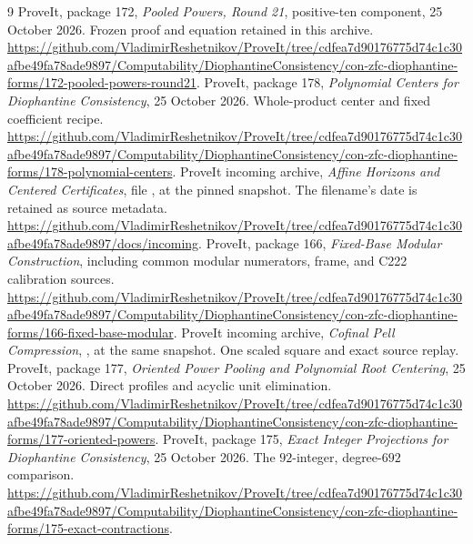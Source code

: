 \documentclass[11pt]{article}
\theoremstyle{remark}
\begin{document}
\clearpage
\begin{thebibliography}{9}
ProveIt, package 172, \emph{Pooled Powers, Round 21}, positive-ten component,
25 October 2026. Frozen proof and equation retained in this archive.
\url{https://github.com/VladimirReshetnikov/ProveIt/tree/cdfea7d90176775d74c1c30afbe49fa78ade9897/Computability/DiophantineConsistency/con-zfc-diophantine-forms/172-pooled-powers-round21}.
ProveIt, package 178, \emph{Polynomial Centers for Diophantine Consistency},
25 October 2026. Whole-product center and fixed coefficient recipe.
\url{https://github.com/VladimirReshetnikov/ProveIt/tree/cdfea7d90176775d74c1c30afbe49fa78ade9897/Computability/DiophantineConsistency/con-zfc-diophantine-forms/178-polynomial-centers}.
ProveIt incoming archive, \emph{Affine Horizons and Centered Certificates},
file ,
at the pinned snapshot. The filename's date is retained as source metadata.
\url{https://github.com/VladimirReshetnikov/ProveIt/tree/cdfea7d90176775d74c1c30afbe49fa78ade9897/docs/incoming}.
ProveIt, package 166, \emph{Fixed-Base Modular Construction}, including
common modular numerators, frame, and C222 calibration sources.
\url{https://github.com/VladimirReshetnikov/ProveIt/tree/cdfea7d90176775d74c1c30afbe49fa78ade9897/Computability/DiophantineConsistency/con-zfc-diophantine-forms/166-fixed-base-modular}.
ProveIt incoming archive, \emph{Cofinal Pell Compression},
,
at the same snapshot. One scaled square and exact source replay.
ProveIt, package 177, \emph{Oriented Power Pooling and Polynomial Root
Centering}, 25 October 2026. Direct profiles and acyclic unit elimination.
\url{https://github.com/VladimirReshetnikov/ProveIt/tree/cdfea7d90176775d74c1c30afbe49fa78ade9897/Computability/DiophantineConsistency/con-zfc-diophantine-forms/177-oriented-powers}.
ProveIt, package 175, \emph{Exact Integer Projections for Diophantine
Consistency}, 25 October 2026. The \(92\)-integer, degree-\(692\) comparison.
\url{https://github.com/VladimirReshetnikov/ProveIt/tree/cdfea7d90176775d74c1c30afbe49fa78ade9897/Computability/DiophantineConsistency/con-zfc-diophantine-forms/175-exact-contractions}.
\end{thebibliography}
\end{document}
